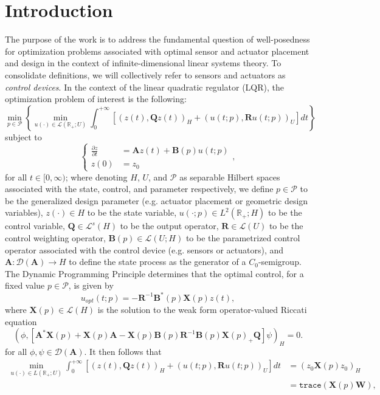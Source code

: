 \documentclass{amsart}
\newcommand{\sL}{\mathscr L}
\newcommand{\p}[1]{\left( {#1} \right)}
\newcommand{\br}[1]{\left[ #1 \right]}
\newcommand{\Br}[1]{\left\{ #1 \right\}}
\newcommand{\trace}[1]{\texttt{trace}\left( #1\right)}
\newcommand{\sP}{\mathcal{P}}
\newcommand{\bA}{\mathbf A}
\newcommand{\bX}{\mathbf X}
\newcommand{\bQ}{\mathbf Q}
\newcommand{\bW}{\mathbf W}
\begin{document}
\section{Introduction}
The purpose of the work is to address the fundamental question of well-posedness for optimization problems associated with optimal sensor and actuator placement and design in the context of infinite-dimensional linear systems theory. To consolidate definitions, we will collectively refer to sensors and actuators as \emph{control devices}. In the context of the linear quadratic regulator (LQR), the optimization problem of interest is the following:
$$
    \min_{p \in \sP} \Br{ \min_{u(\cdot)\in \sL(\mathbb R_+;U)} \int_0^{+\infty}
    \br{\p{z(t),\bQ z(t)}_H + \p{u(t;p),\mathbf R u(t;p)}_U} dt}
$$
subject to
$$
\left\{
\begin{aligned}
    \frac{\partial z}{\partial t} &= \bA z(t) + \mathbf B(p)u(t;p) \\
    z(0) &= z_0
\end{aligned}
\right.,
$$
for all $t \in [0, \infty)$; where denoting $H$, $U$, and $\sP$ as separable Hilbert spaces associated with the state, control, and parameter respectively, we define $p\in \sP$ to be the generalized design parameter (e.g. actuator placement or geometric design variables), $z(\cdot)\in H$ to be the state variable, $u(\cdot;p) \in L^2(\mathbb R_+; H)$ to be the control variable, $\bQ \in \sL^s(H)$ to be the output operator, $\mathbf R \in \sL(U)$ to be the control weighting operator, $\mathbf B(p) \in \sL(U;H)$ to be the parametrized control operator associated with the control device (e.g. sensors or actuators), and $\bA: \mathcal D(\bA) \rightarrow H$ to define the state process as the generator of a $C_0$-semigroup. The Dynamic Programming Principle determines that the optimal control, for a fixed value $p \in \sP$, is given by
$$
    u_{opt}(t;p) = -\mathbf R^{-1} \mathbf B^*(p) \bX(p) z(t),
$$
where $\bX(p) \in \sL(H)$ is the solution to the weak form operator-valued Riccati equation
$$
    \p{\phi,\br{\bA^*\bX(p) + \bX(p)\bA - \bX(p)\mathbf B(p) \mathbf R^{-1}\mathbf B(p)\bX(p)_ + \bQ}\psi}_H = 0.
$$
for all $\phi,\psi \in \mathcal D(\bA)$. It then follows \cite[Theorem 6.2.4]{curtain2012introduction} that
$$
\begin{aligned}
\min_{u(\cdot)\in L(\mathbb R_+;U)} \int_0^{+\infty}
    \br{\p{z(t),\bQ z(t)}_H + \p{u(t;p),\mathbf R u(t;p)}_U} dt 
    &= \p{z_0 \bX(p) z_0}_H \\
   &=\trace{\bX(p) \bW},
\end{aligned}
$$
\end{document}
